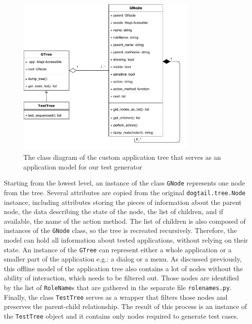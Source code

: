 \begin{figure}[hbt!]
	\centering
	\includegraphics[width=0.8\textwidth,clip]{obrazky-figures/tree_diagram.pdf}
	\caption{The class diagram of the custom application tree that serves as an application model for our test generator}
	\label{tree_diagram}
\end{figure}

Starting from the lowest level, an instance of the class \texttt{GNode} represents one node from the tree. Several attributes are copied from the original \texttt{dogtail.tree.Node} instance, including attributes storing the pieces of information about the parent node, the data describing the state of the node, the list of children, and if available, the name of the action method. The list of children is also composed of instances of the \texttt{GNode} class, so the tree is recreated recursively. Therefore, the model can hold all information about tested applications, without relying on their state. An instance of the \texttt{GTree} can represent either a whole application or a smaller part of the application e.g.: a dialog or a menu. As discussed previously, this offline model of the application tree also contains a lot of nodes without the ability of interaction, which needs to be filtered out. Those nodes are identified by the list of \texttt{RoleName}s that are gathered in the separate file \texttt{rolenames.py}. Finally, the class \texttt{TestTree} serves as a wrapper that filters those nodes and preserves the parent-child relationship. The result of this process is an instance of the \texttt{TestTree} object and it contains only nodes required to generate test cases. 


